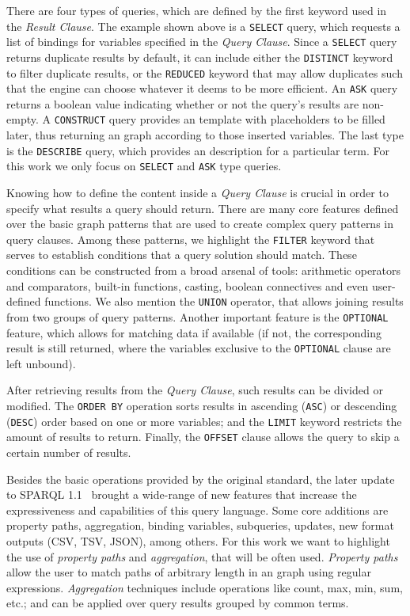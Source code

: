 There are four types of \SPARQL{} queries, which are defined by the first keyword used in the 
\textit{Result Clause}. The example shown above is a \texttt{SELECT} query, which requests a list 
of bindings for variables specified in the \textit{Query Clause}. Since a \texttt{SELECT} query 
returns duplicate results by default, it can include either the \texttt{DISTINCT} keyword to filter 
duplicate results, or the \texttt{REDUCED} keyword that may allow duplicates such that the engine 
can choose whatever it deems to be more efficient. An \texttt{ASK} query returns a boolean value 
indicating whether or not the query’s results are non-empty. A \texttt{CONSTRUCT} query provides 
an \RDF{} template with placeholders to be filled later, thus returning an \RDF{} graph according to 
those inserted variables. The last type is the \texttt{DESCRIBE} query, which provides an \RDF{} 
description for a particular \RDF{} term. For this work we only focus on \texttt{SELECT} and 
\texttt{ASK} type queries.

Knowing how to define the content inside a \textit{Query Clause} is crucial in order to specify what results 
a \SPARQL{} query should return. There are many core features defined over the basic graph patterns 
that are used to create complex query patterns in query clauses. Among these patterns, we highlight 
the \texttt{FILTER} keyword that serves to establish conditions that a query solution should match. 
These conditions can be constructed from a broad arsenal of tools: arithmetic operators and 
comparators, built-in functions, casting, boolean connectives and even user-defined functions. 
We also mention the \texttt{UNION} operator, that allows joining results from two groups of query 
patterns. Another important feature is the \texttt{OPTIONAL} feature, which allows for matching 
data if available (if not, the corresponding result is still returned, where the variables 
exclusive to the \texttt{OPTIONAL} clause are left unbound).

After retrieving results from the \textit{Query Clause}, such results can be divided or modified. 
The \texttt{ORDER BY} operation sorts results in ascending (\texttt{ASC}) or descending (\texttt{DESC}) order based 
on one or more variables; and the \texttt{LIMIT} keyword restricts the amount of results to return. 
Finally, the \texttt{OFFSET} clause allows the query to skip a certain number of results.

Besides the basic operations provided by the original \SPARQL{} standard, the later update to 
SPARQL 1.1~\cite{key:sparql11} brought a wide-range of new features that increase the expressiveness 
and capabilities of this query language. Some core additions are property paths, aggregation, 
binding variables, subqueries, updates, new format outputs (CSV, TSV, JSON), among others. 
For this work we want to highlight the use of \textit{property paths} and \textit{aggregation}, 
that will be often used. \textit{Property paths} allow the user to match paths of arbitrary 
length in an \RDF{} graph using regular expressions. \textit{Aggregation} techniques include 
operations like count, max, min, sum, etc.; and can be applied over query results grouped 
by common terms.

